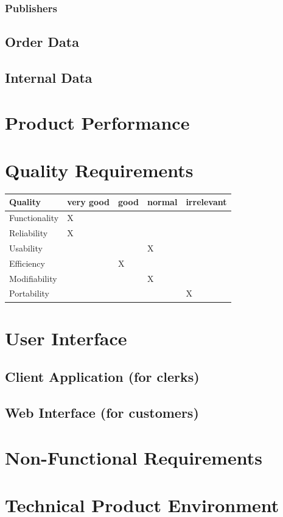 \documentclass[11pt,a4paper,oneside,svgnames]{report}
\begin{document}
\subsection{Publishers}
\section{Order Data}
\section{Internal Data}

\chapter{Product Performance}
\chapter{Quality Requirements}
\begin{table}[h!]
 \begin{tabular}{lllll}
  \hline
  Quality & very good & good & normal & irrelevant \\
  \hline
  Functionality & X & & & \\
  Reliability & X & & & \\
  Usability & & & X & \\
  Efficiency & & X & & \\
  Modifiability & & & X & \\
  Portability & & & & X \\
  \hline
 \end{tabular}
\end{table}

\chapter{User Interface}
\section{Client Application (for clerks)}
\section{Web Interface (for customers)}

\chapter{Non-Functional Requirements}
\chapter{Technical Product Environment}
\end{document}
